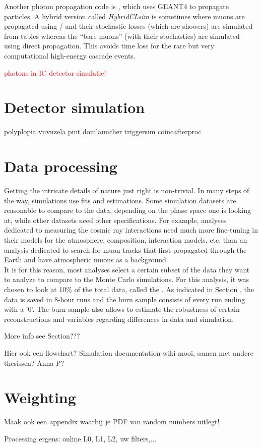 \noindent Another photon propagation code is , which uses GEANT4 to propagate particles. A hybrid version called \textit{HybridCLsim} is sometimes where muons are propagated using / and their stochastic losses (which are showers) are simulated from tables whereas the ``bare muons'' (with their stochastics) are simulated using direct propagation. This avoids time loss for the rare but very computational high-energy cascade events.



\textcolor{red}{photons in IC detector simulatie!}





\section{Detector simulation}
polyplopia vuvuzela pmt domlauncher triggersim coincafterproc





\section{Data processing}
Getting the intricate details of nature just right is non-trivial. In many steps of the way, simulations use fits and estimations. Some simulation datasets are reasonable to compare to the data, depending on the phase space one is looking at, while other datasets need other specifications. For example, analyses dedicated to measuring the cosmic ray interactions need much more fine-tuning in their models for the atmosphere, composition, interaction models, etc. than an analysis dedicated to search for muon tracks that first propagated through the Earth and have atmospheric muons as a background.\\

\noindent It is for this reason, most analyses select a certain subset of the data they want to analyze to compare to the Monte Carlo simulations. For this analysis, it was chosen to look at 10\% of the total data, called the . As indicated in Section \cite{subsec:datahandling}, the data is saved in 8-hour runs and the burn sample consists of every run ending with a '0'. The burn sample also allows to estimate the robustness of certain reconstructions and variables regarding differences in data and simulation.


More info see Section???


Hier ook een flowchart? Simulation documentation wiki mooi, samen met andere thesissen? Anna P?

\section{Weighting}
\label{sec:weighting}
Maak ook een appendix waarbij je PDF van random numbers uitlegt!






Processing ergens: online L0, L1, L2, uw filters,...
